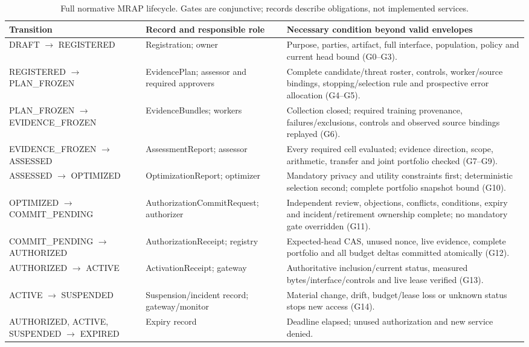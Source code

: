 \begin{table}[t]
\centering\small
\caption{Full normative MRAP lifecycle. Gates are conjunctive; records describe obligations, not implemented services.}
\label{tab:lifecycle}
\begin{tabular}{>{\raggedright\arraybackslash}p{}>{\raggedright\arraybackslash}p{}>{\raggedright\arraybackslash}p{}}
\toprule
Transition & Record and responsible role & Necessary condition beyond valid envelopes \\
\midrule
DRAFT $\to$ REGISTERED & Registration; owner & Purpose, parties, artifact, full interface, population, policy and current head bound (G0--G3). \\
REGISTERED $\to$ PLAN\_FROZEN & EvidencePlan; assessor and required approvers & Complete candidate/threat roster, controls, worker/source bindings, stopping/selection rule and prospective error allocation (G4--G5). \\
PLAN\_FROZEN $\to$ EVIDENCE\_FROZEN & EvidenceBundles; workers & Collection closed; required training provenance, failures/exclusions, controls and observed source bindings replayed (G6). \\
EVIDENCE\_FROZEN $\to$ ASSESSED & AssessmentReport; assessor & Every required cell evaluated; evidence direction, scope, arithmetic, transfer and joint portfolio checked (G7--G9). \\
ASSESSED $\to$ OPTIMIZED & OptimizationReport; optimizer & Mandatory privacy and utility constraints first; deterministic selection second; complete portfolio snapshot bound (G10). \\
OPTIMIZED $\to$ COMMIT\_PENDING & AuthorizationCommitRequest; authorizer & Independent review, objections, conflicts, conditions, expiry and incident/retirement ownership complete; no mandatory gate overridden (G11). \\
COMMIT\_PENDING $\to$ AUTHORIZED & AuthorizationReceipt; registry & Expected-head CAS, unused nonce, live evidence, complete portfolio and all budget deltas committed atomically (G12). \\
AUTHORIZED $\to$ ACTIVE & ActivationReceipt; gateway & Authoritative inclusion/current status, measured bytes/interface/controls and live lease verified (G13). \\
ACTIVE $\to$ SUSPENDED & Suspension/incident record; gateway/monitor & Material change, drift, budget/lease loss or unknown status stops new access (G14). \\
AUTHORIZED, ACTIVE, SUSPENDED $\to$ EXPIRED & Expiry record & Deadline elapsed; unused authorization and new service denied. \\

\end{tabular}
\end{table}
